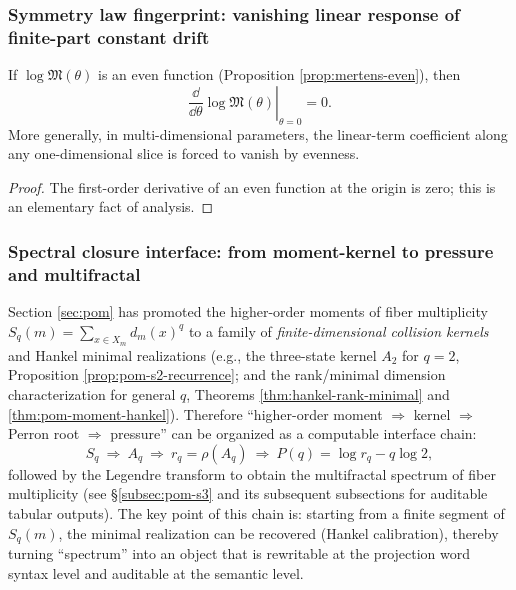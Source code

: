 \subsubsection{Symmetry law fingerprint: vanishing linear response of finite-part constant drift}
\begin{corollary}[Evenness \texorpdfstring{$\Rightarrow$}{=>} vanishing first-order term]\label{cor:pom-logm-linear-response-zero}
If \(\log\mathfrak{M}(\theta)\) is an even function (Proposition \ref{prop:mertens-even}), then
$$
\left.\frac{\dd}{\dd\theta}\log\mathfrak{M}(\theta)\right|_{\theta=0}=0.
$$
More generally, in multi-dimensional parameters, the linear-term coefficient along any one-dimensional slice is forced to vanish by evenness.
\end{corollary}
\begin{proof}
The first-order derivative of an even function at the origin is zero; this is an elementary fact of analysis.
\end{proof}

\subsubsection{Spectral closure interface: from moment-kernel to pressure and multifractal}
\begin{remark}\label{rem:pom-moment-kernel-chain}
Section \ref{sec:pom} has promoted the higher-order moments of fiber multiplicity
\(
S_q(m)=\sum_{x\in X_m}d_m(x)^q
\)
to a family of \emph{finite-dimensional collision kernels} and Hankel minimal realizations (e.g., the three-state kernel \(A_2\) for \(q=2\), Proposition \ref{prop:pom-s2-recurrence}; and the rank/minimal dimension characterization for general \(q\), Theorems \ref{thm:hankel-rank-minimal} and \ref{thm:pom-moment-hankel}).
Therefore ``higher-order moment \(\Rightarrow\) kernel \(\Rightarrow\) Perron root \(\Rightarrow\) pressure'' can be organized as a computable interface chain:
$$
S_q\ \Longrightarrow\ A_q\ \Longrightarrow\ r_q=\rho(A_q)\ \Longrightarrow\ P(q)=\log r_q-q\log 2,
$$
followed by the Legendre transform to obtain the multifractal spectrum of fiber multiplicity (see \S\ref{subsec:pom-s3} and its subsequent subsections for auditable tabular outputs).
The key point of this chain is: starting from a finite segment of \(S_q(m)\), the minimal realization can be recovered (Hankel calibration), thereby turning ``spectrum'' into an object that is rewritable at the projection word syntax level and auditable at the semantic level.
\end{remark}

